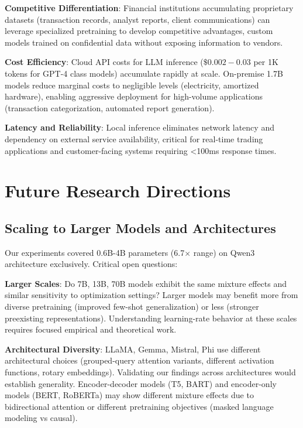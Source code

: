 \textbf{Competitive Differentiation}: Financial institutions accumulating proprietary datasets (transaction records, analyst reports, client communications) can leverage specialized pretraining to develop competitive advantages, custom models trained on confidential data without exposing information to vendors.

\textbf{Cost Efficiency}: Cloud API costs for LLM inference ($\$0.002-0.03$ per 1K tokens for GPT-4 class models) accumulate rapidly at scale. On-premise 1.7B models reduce marginal costs to negligible levels (electricity, amortized hardware), enabling aggressive deployment for high-volume applications (transaction categorization, automated report generation).

\textbf{Latency and Reliability}: Local inference eliminates network latency and dependency on external service availability, critical for real-time trading applications and customer-facing systems requiring <100ms response times.

\section{Future Research Directions}

\subsection{Scaling to Larger Models and Architectures}

Our experiments covered 0.6B-4B parameters (6.7$\times$ range) on Qwen3 architecture exclusively. Critical open questions:

\textbf{Larger Scales}: Do 7B, 13B, 70B models exhibit the same mixture effects and similar sensitivity to optimization settings? Larger models may benefit more from diverse pretraining (improved few-shot generalization) or less (stronger preexisting representations). Understanding learning-rate behavior at these scales requires focused empirical and theoretical work.

\textbf{Architectural Diversity}: LLaMA, Gemma, Mistral, Phi use different architectural choices (grouped-query attention variants, different activation functions, rotary embeddings). Validating our findings across architectures would establish generality. Encoder-decoder models (T5, BART) and encoder-only models (BERT, RoBERTa) may show different mixture effects due to bidirectional attention or different pretraining objectives (masked language modeling vs causal).


